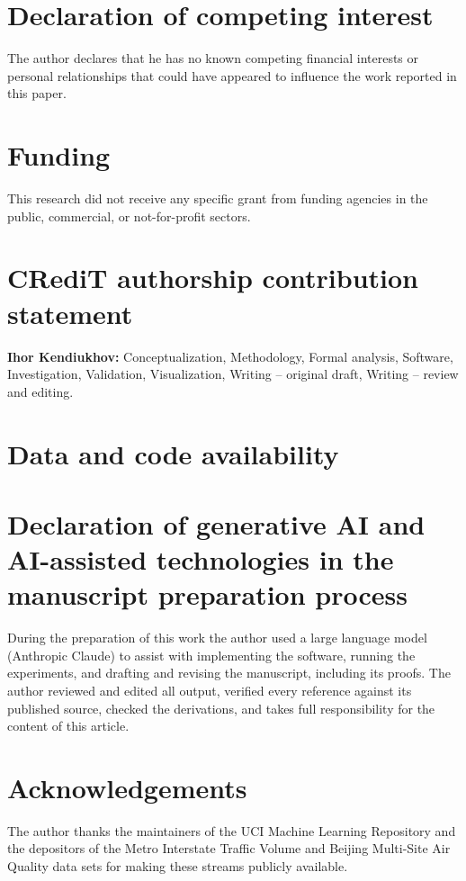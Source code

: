 \FloatBarrier

\section*{Declaration of competing interest}
The author declares that he has no known competing financial interests or personal relationships
that could have appeared to influence the work reported in this paper.

\section*{Funding}
This research did not receive any specific grant from funding agencies in the public, commercial,
or not-for-profit sectors.

\section*{CRediT authorship contribution statement}
\textbf{Ihor Kendiukhov:} Conceptualization, Methodology, Formal analysis, Software,
Investigation, Validation, Visualization, Writing -- original draft, Writing -- review and
editing.

\section*{Data and code availability}


\section*{Declaration of generative AI and AI-assisted technologies in the manuscript preparation
process}
During the preparation of this work the author used a large language model
(Anthropic Claude) to assist with implementing the software, running the experiments, and drafting
and revising the manuscript, including its proofs. The author reviewed and edited all output,
verified every reference against its published source, checked the derivations, and takes full
responsibility for the content of this article.

\section*{Acknowledgements}
The author thanks the maintainers of the UCI Machine Learning Repository and the depositors of the
Metro Interstate Traffic Volume and Beijing Multi-Site Air Quality data sets for making these
streams publicly available.




\appendix
\setcounter{figure}{0}\setcounter{table}{0}
\makeatletter
{}
\makeatother
\renewcommand{\thefigure}{\Alph{section}.\arabic{figure}}
\renewcommand{\thetable}{\Alph{section}.\arabic{table}}

